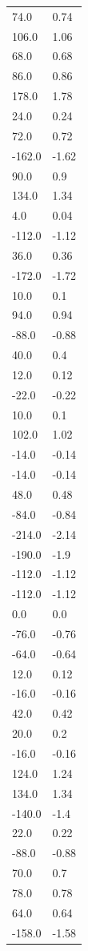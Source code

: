 \begin{longtable}{ll}
74.0 & 0.74 \\
106.0 & 1.06 \\
68.0 & 0.68 \\
86.0 & 0.86 \\
178.0 & 1.78 \\
24.0 & 0.24 \\
72.0 & 0.72 \\
-162.0 & -1.62 \\
90.0 & 0.9 \\
134.0 & 1.34 \\
4.0 & 0.04 \\
-112.0 & -1.12 \\
36.0 & 0.36 \\
-172.0 & -1.72 \\
10.0 & 0.1 \\
94.0 & 0.94 \\
-88.0 & -0.88 \\
40.0 & 0.4 \\
12.0 & 0.12 \\
-22.0 & -0.22 \\
10.0 & 0.1 \\
102.0 & 1.02 \\
-14.0 & -0.14 \\
-14.0 & -0.14 \\
48.0 & 0.48 \\
-84.0 & -0.84 \\
-214.0 & -2.14 \\
-190.0 & -1.9 \\
-112.0 & -1.12 \\
-112.0 & -1.12 \\
0.0 & 0.0 \\
-76.0 & -0.76 \\
-64.0 & -0.64 \\
12.0 & 0.12 \\
-16.0 & -0.16 \\
42.0 & 0.42 \\
20.0 & 0.2 \\
-16.0 & -0.16 \\
124.0 & 1.24 \\
134.0 & 1.34 \\
-140.0 & -1.4 \\
22.0 & 0.22 \\
-88.0 & -0.88 \\
70.0 & 0.7 \\
78.0 & 0.78 \\
64.0 & 0.64 \\
-158.0 & -1.58 \\

\end{longtable}

